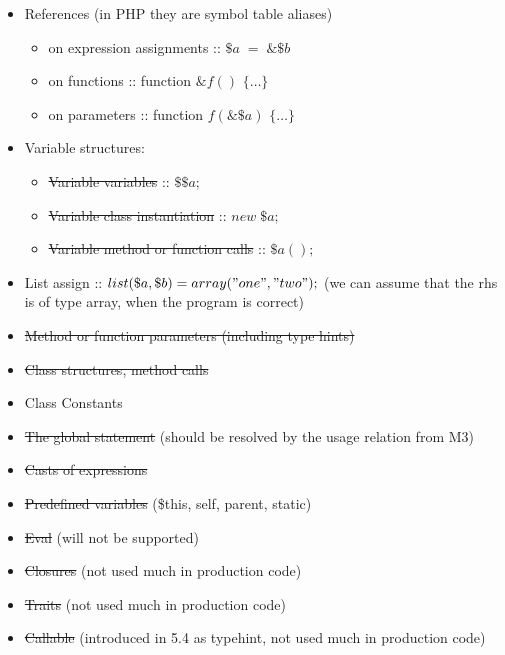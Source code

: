 \documentclass[../main.tex]{subfiles}
\begin{document}
    \begin{itemize}
        
        \item References (in PHP they are symbol table aliases)
        \begin{itemize}
            \item on expression assignments :: $\$a \; = \; \&\$b$
            \item on functions :: function $\&f()$ $\{ \dots \}$
            \item on parameters :: function $f(\&\$a)$ $\{ \dots \}$             
        \end{itemize}

        \item Variable structures:
        \begin{itemize}
            \item \sout{Variable variables} :: $\$\$a;$
            \item \sout{Variable class instantiation} :: $new \; \$a;$
            \item \sout{Variable method or function calls} :: $\$a();$
        \end{itemize}

        \item List assign :: $list(\$a, \$b) = array("one", "two");$ (we can assume that the rhs is of type array, when the program is correct)
        
        \item \sout{Method or function parameters (including type hints)}
        \item \sout{Class structures, method calls}
        \item Class Constants
        
        \item \sout{The global statement} (should be resolved by the usage relation from M3)
        
        \item \sout{Casts of expressions}
        
        \item \sout{Predefined variables} (\$this, self, parent, static)

        \item \sout{Eval} (will not be supported)        
        \item \sout{Closures} (not used much in production code)
        \item \sout{Traits} (not used much in production code)
        \item \sout{Callable} (introduced in 5.4 as typehint, not used much in production code)
        

\end{itemize}
\end{document}
